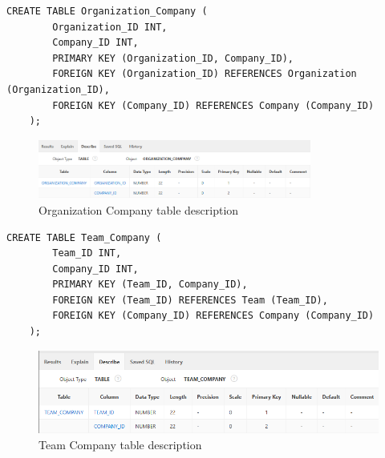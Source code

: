 \begin{lstlisting}[caption={Create Organization Company table}, label={lst:create_organization_company}]
    CREATE TABLE Organization_Company (
        Organization_ID INT,
        Company_ID INT,
        PRIMARY KEY (Organization_ID, Company_ID),
        FOREIGN KEY (Organization_ID) REFERENCES Organization (Organization_ID),
        FOREIGN KEY (Company_ID) REFERENCES Company (Company_ID)
    );
    \end{lstlisting}
\begin{figure}[H]
    \centering
    \includegraphics[width=0.8\textwidth]{images/TableDesc/ORGANIZATION_COMPANY.png}
    \caption{Organization Company table description}
    \label{fig:organization_company_table}
\end{figure}
\begin{lstlisting}[caption={Create Team Company table}, label={lst:create_team_company}]
    CREATE TABLE Team_Company (
        Team_ID INT,
        Company_ID INT,
        PRIMARY KEY (Team_ID, Company_ID),
        FOREIGN KEY (Team_ID) REFERENCES Team (Team_ID),
        FOREIGN KEY (Company_ID) REFERENCES Company (Company_ID)
    );
    \end{lstlisting}
\begin{figure}[H]
    \centering
    \includegraphics[width=1\textwidth]{images/TableDesc/TEAM_COMPANY.png}
    \caption{Team Company table description}
    \label{fig:team_company_table}
\end{figure}
